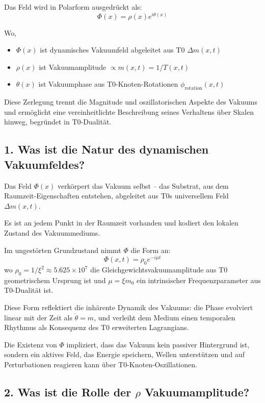 \documentclass[12pt,a4paper]{article}
\begin{document}
	Das Feld wird in Polarform ausgedrückt als:
	\[
	\Phi(x)=\rho(x)e^{i\theta(x)}
	\]
	
	Wo,
	\begin{itemize}
		\item $\Phi(x)$ ist dynamisches Vakuumfeld abgeleitet aus T0 $\Delta m(x,t)$
		\item $\rho(x)$ ist Vakuumamplitude $\propto m(x,t) = 1/T(x,t)$
		\item $\theta(x)$ ist Vakuumphase aus T0-Knoten-Rotationen $\phi_{\text{rotation}}(x,t)$
	\end{itemize}
	
	Diese Zerlegung trennt die Magnitude und oszillatorischen Aspekte des Vakuums und ermöglicht eine vereinheitlichte Beschreibung seines Verhaltens über Skalen hinweg, begründet in T0-Dualität.
	
	\subsection{1. Was ist die Natur des dynamischen Vakuumfeldes?}
	
	Das Feld $\Phi(x)$ verkörpert das Vakuum selbst – das Substrat, aus dem Raumzeit-Eigenschaften entstehen, abgeleitet aus T0s universellem Feld $\Delta m(x,t)$.
	
	Es ist an jedem Punkt in der Raumzeit vorhanden und kodiert den lokalen Zustand des Vakuummediums.
	
	Im ungestörten Grundzustand nimmt $\Phi$ die Form an:
	\[
	\Phi(x, t)= \rho_0 e^{-i\mu t}
	\]
	wo $\rho_0 = 1/\xi^2 \approx 5.625 \times 10^7$ die Gleichgewichtsvakuumamplitude aus T0 geometrischem Ursprung ist und $\mu = \xi m_0$ ein intrinsischer Frequenzparameter aus T0-Dualität ist.
	
	Diese Form reflektiert die inhärente Dynamik des Vakuums: die Phase evolviert linear mit der Zeit als $\dot{\theta} = m$, und verleiht dem Medium einen temporalen Rhythmus als Konsequenz des T0 erweiterten Lagrangians.
	
	Die Existenz von $\Phi$ impliziert, dass das Vakuum kein passiver Hintergrund ist, sondern ein aktives Feld, das Energie speichern, Wellen unterstützen und auf Perturbationen reagieren kann über T0-Knoten-Oszillationen.
	
	\subsection{2. Was ist die Rolle der $\rho$ Vakuumamplitude?}
	
\end{document}
